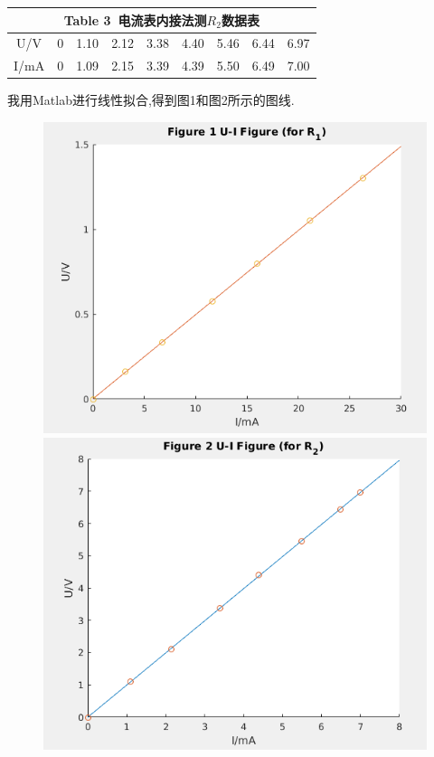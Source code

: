 \documentclass[a4paper,10pt,notitlepage]{report}
\begin{document}
\begin{table}[bhtp]
\centering
	\begin{tabular}{|c|c|c|c|c|c|c|c|c|}
	
	\multicolumn{9}{c}{Table 3\ 电流表内接法测$R_2$数据表} \\
	\hline
	U/V & 0 & 1.10 & 2.12 & 3.38 & 4.40 & 5.46 & 6.44 & 6.97 \\
	\hline
	I/mA & 0 & 1.09 & 2.15 & 3.39 & 4.39 & 5.50 & 6.49 & 7.00 \\
	\hline
	
	\end{tabular}
\end{table}

	我用Matlab进行线性拟合,得到图1和图2所示的图线. \\
	
\begin{figure}[htbp]
\centering
	\includegraphics[scale=.45]{r1.png}
	\includegraphics[scale=.45]{r2.png}
\end{figure}
\end{document}
